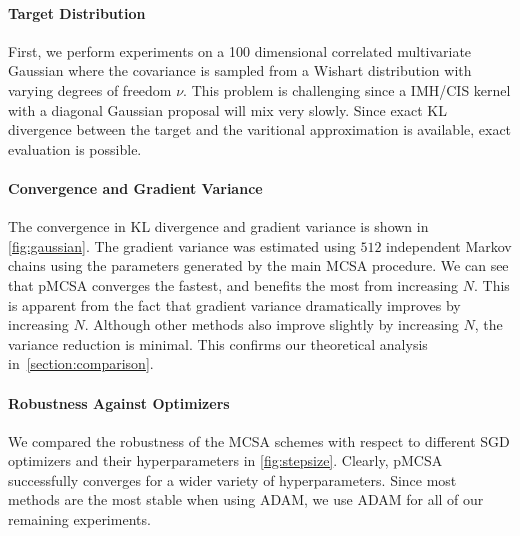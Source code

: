 \paragraph{Target Distribution}
First, we perform experiments on a 100 dimensional correlated multivariate Gaussian where the covariance is sampled from a Wishart distribution with varying degrees of freedom \(\nu\).
This problem is challenging since a IMH/CIS kernel with a diagonal Gaussian proposal will mix very slowly.
Since exact KL divergence between the target and the varitional approximation is available, exact evaluation is possible.

\vspace{-0.1in}
\paragraph{Convergence and Gradient Variance}
The convergence in KL divergence and gradient variance is shown in \cref{fig:gaussian}.
The gradient variance was estimated using \(512\) independent Markov chains using the parameters generated by the main MCSA procedure.
We can see that pMCSA converges the fastest, and benefits the most from increasing \(N\).
This is apparent from the fact that gradient variance dramatically improves by increasing \(N\).
Although other methods also improve slightly by increasing \(N\), the variance reduction is minimal.
This confirms our theoretical analysis in~\cref{section:comparison}.

\vspace{-0.1in}
\paragraph{Robustness Against Optimizers}
We compared the robustness of the MCSA schemes with respect to different SGD optimizers and their hyperparameters in \cref{fig:stepsize}.
Clearly, pMCSA successfully converges for a wider variety of hyperparameters.
Since most methods are the most stable when using ADAM, we use ADAM for all of our remaining experiments.


